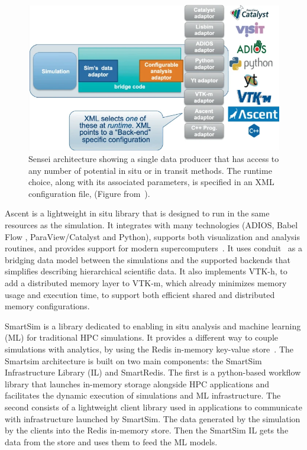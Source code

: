 \begin{figure}[tb]\centering
\includegraphics[scale=0.5]{figures/sensei.png}
\caption{Sensei architecture showing a single data producer that has access to any number of potential in situ or in transit methods. The runtime choice, along with its associated parameters, is specified in an XML configuration file, (Figure from~\cite{bethel_sensei_2022}).}
\label{figsensei}
\end{figure}

Ascent\cite{ noauthor_ascent_nodate, Larsen-alpine-isav17, triggers_ascent, Larsen_ascent} is a lightweight in situ library that is designed to run in the same resources as the simulation. It integrates with many technologies (ADIOS, Babel Flow \cite{babel}, ParaView/Catalyst and Python), supports both visualization and analysis routines, and provides support for modern supercomputers~\cite{childs2022situ}.  
It uses conduit~\cite{larsen_strawman_2015, noauthor_conduit_nodate} as a bridging data model between the simulations and the supported backends that simplifies describing hierarchical scientific data. It also implements VTK-h, to add a distributed memory layer to VTK-m, which already minimizes memory usage and execution time, to support both efficient shared and distributed memory configurations. 

SmartSim\cite{smartsim_2022, site_introduction_smartsim, partee2021using_smartsim} is a library dedicated to enabling in situ analysis and machine learning (ML) for traditional HPC simulations. It provides a different way to couple simulations with analytics, by using the Redis\cite{redis} in-memory key-value store~\cite{idreos2019learning_key_value}. 
The Smartsim architecture is built on two main components: the SmartSim Infrastructure Library (IL) and SmartRedis. The first is a python-based workflow library that launches in-memory storage alongside HPC applications and facilitates the dynamic execution of simulations and ML infrastructure. 
The second consists of a lightweight client library used in applications to communicate with infrastructure launched by SmartSim. 
The data generated by the simulation by the clients into the Redis in-memory store. Then the SmartSim IL gets the data from the store and uses them to feed the ML models.

